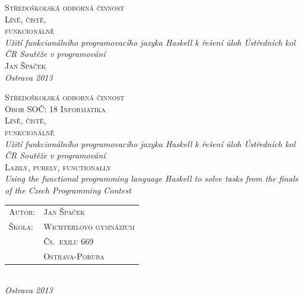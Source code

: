 
\begin{titlepage}
\begin{center}

\textsc{\LARGE Středoškolská odborná činnost}\\[4cm]

\textsc{\Huge Líně, čistě,\\ funkcionálně}\\[0.5cm]

\textit{\LARGE Užití funkcionálního programovacího jazyka Haskell k řešení
úloh Ústředních kol ČR Soutěže v programování}\\[2cm]

\textsc{\huge Jan Špaček}\\[10cm]

\textit{\LARGE Ostrava 2013}

\end{center}
\end{titlepage}

\thispagestyle{empty}
\cleardoublepage


\begin{center}

\textsc{\LARGE Středoškolská odborná činnost}\\[0.6cm]
\textsc{\large Obor SOČ: 18 Informatika}\\[2cm]

\textsc{\Huge Líně, čistě,\\ funkcionálně}\\[0.5cm]

\textit{\LARGE Užití funkcionálního programovacího jazyka Haskell k řešení
úloh Ústředních kol ČR Soutěže v programování}\\[2cm]

\textsc{\huge Lazily, purely, functionally}\\[0.3cm]

\textit{\Large Using the functional programming language Haskell to solve
tasks from the finals of the Czech Programming Contest}\\[3cm]

\begin{tabularx}{12cm}{
  >{\Large\scshape}p{3cm} 
  >{\LARGE\scshape}X 
}
Autor:    & Jan Špaček \\[0.5cm]
Škola:    & Wichterlovo gymnázium \\[0.15cm]
          & Čs.~exilu 669 \\[0.2cm]
          & Ostrava-Poruba \\
\end{tabularx}
\\[3cm]

\textit{\LARGE Ostrava 2013}

\end{center}

